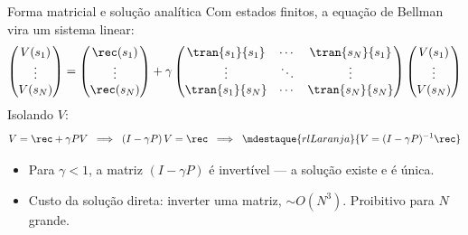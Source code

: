 \documentclass[aspectratio=169, 11pt]{beamer}
\begin{document}
\begin{frame}{Forma matricial e solução analítica}
  Com estados finitos, a equação de Bellman vira um sistema linear:
  \[
    \begin{pmatrix} V(s_1) \\ \vdots \\ V(s_N) \end{pmatrix}
    =
    \begin{pmatrix} \rec(s_1) \\ \vdots \\ \rec(s_N) \end{pmatrix}
    + \gamma
    \begin{pmatrix}
      \tran{s_1}{s_1} & \cdots & \tran{s_N}{s_1} \\
      \vdots          & \ddots & \vdots          \\
      \tran{s_1}{s_N} & \cdots & \tran{s_N}{s_N}
    \end{pmatrix}
    \begin{pmatrix} V(s_1) \\ \vdots \\ V(s_N) \end{pmatrix}
  \]
  Isolando $V$:
  \[
    V = \rec + \gamma P V
    \;\;\Longrightarrow\;\;
    (I - \gamma P)\, V = \rec
    \;\;\Longrightarrow\;\;
    \mdestaque{rlLaranja}{V = (I - \gamma P)^{-1} \rec}
  \]

  \begin{itemize}
    \item Para $\gamma < 1$, a matriz $(I - \gamma P)$ é invertível — a
          solução existe e é única.
    \item Custo da solução direta: inverter uma matriz, $\sim O(N^3)$.
          Proibitivo para $N$ grande.
  \end{itemize}
\end{frame}
\end{document}
